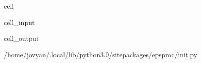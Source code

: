 \documentclass[letterpaper,table,10pt,english]{jupyterBook}
\begin{document}
\begin{sphinxuseclass}{cell}\begin{sphinxVerbatimInput}

\begin{sphinxuseclass}{cell_input}
\begin{sphinxVerbatim}[commandchars=\\\{\}]
   
   
\end{sphinxVerbatim}

\end{sphinxuseclass}\end{sphinxVerbatimInput}
\begin{sphinxVerbatimOutput}

\begin{sphinxuseclass}{cell_output}
\begin{sphinxVerbatim}[commandchars=\\\{\}]
\PYGZsq{}/home/jovyan/.local/lib/python3.9/site\PYGZhy{}packages/epsproc/\PYGZus{}\PYGZus{}init\PYGZus{}\PYGZus{}.py\PYGZsq{}
\end{sphinxVerbatim}

\end{sphinxuseclass}\end{sphinxVerbatimOutput}

\end{sphinxuseclass}
\end{document}
